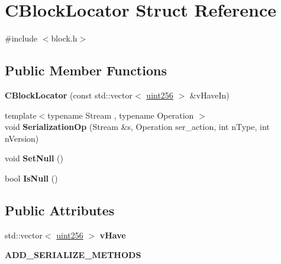 \hypertarget{struct_c_block_locator}{}\section{C\+Block\+Locator Struct Reference}
\label{struct_c_block_locator}


{\ttfamily \#include $<$block.\+h$>$}

\subsection*{Public Member Functions}
\begin{DoxyCompactItemize}
\item 
\mbox{\label{struct_c_block_locator_a12bd4c9c6f4fc9892e2c1f4c8e083226}} 
{\bfseries C\+Block\+Locator} (const std\+::vector$<$ \mbox{\hyperlink{classuint256}{uint256}} $>$ \&v\+Have\+In)
\item 
\mbox{\label{struct_c_block_locator_a29de31101d53c3a40d140695c4857c24}} 
{\footnotesize template$<$typename Stream , typename Operation $>$ }\\void {\bfseries Serialization\+Op} (Stream \&s, Operation ser\+\_\+action, int n\+Type, int n\+Version)
\item 
\mbox{\label{struct_c_block_locator_ae103102302c0c4e5ecec109b7dee1512}} 
void {\bfseries Set\+Null} ()
\item 
\mbox{\label{struct_c_block_locator_aa34a6e267a83b4e5b514275f6392ca22}} 
bool {\bfseries Is\+Null} ()
\end{DoxyCompactItemize}
\subsection*{Public Attributes}
\begin{DoxyCompactItemize}
\item 
\mbox{\label{struct_c_block_locator_a745204ecd8c9326b43ac54d7f780534f}} 
std\+::vector$<$ \mbox{\hyperlink{classuint256}{uint256}} $>$ {\bfseries v\+Have}
\item 
\mbox{\label{struct_c_block_locator_a543b8a4c763183dc9121caade061441f}} 
{\bfseries A\+D\+D\+\_\+\+S\+E\+R\+I\+A\+L\+I\+Z\+E\+\_\+\+M\+E\+T\+H\+O\+DS}
\end{DoxyCompactItemize}


